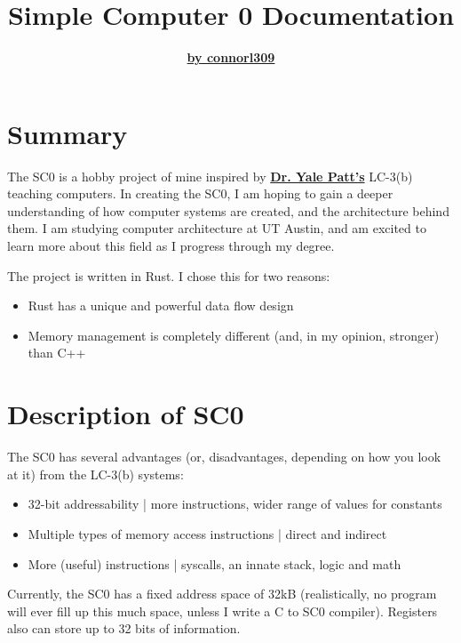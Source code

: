 \documentclass{article}
\begin{document}
\title{\Huge\textbf{Simple Computer 0 Documentation}}
\author{\href{https://github.com/connorl309/}{\textbf{by connorl309}}}
\date{}
\maketitle

\begin{tableofcontents}
\pagebreak
\section{\Huge Summary}
\begin{Large}
The SC0 is a hobby project of mine inspired by \href{https://users.ece.utexas.edu/~patt/}{\textbf{Dr. Yale Patt's}}
LC-3(b) teaching computers. In creating the SC0, I am hoping to gain a deeper understanding
of how computer systems are created, and the architecture behind them. I am studying computer
architecture at UT Austin, and am excited to learn more about this field as I progress through
my degree.

The project is written in Rust. I chose this for two reasons: 
\begin{itemize}
    \item Rust has a unique and powerful data flow design
    \item Memory management is completely different (and, in my opinion, stronger) than C++
\end{itemize}
\end{Large}

\section{\Huge Description of SC0}
\begin{Large}
The SC0 has several advantages (or, disadvantages, depending on how you look at it) from
the LC-3(b) systems:
\begin{itemize}
    \item 32-bit addressability | more instructions, wider range of values for constants
    \item Multiple types of memory access instructions | direct and indirect
    \item More (useful) instructions | syscalls, an innate stack, logic and math
\end{itemize}
Currently, the SC0 has a fixed address space of 32kB (realistically, no program will ever fill
up this much space, unless I write a C to SC0 compiler). Registers also can store up to 32 bits
of information.


\end{Large}
\end{tableofcontents}
\end{document}
